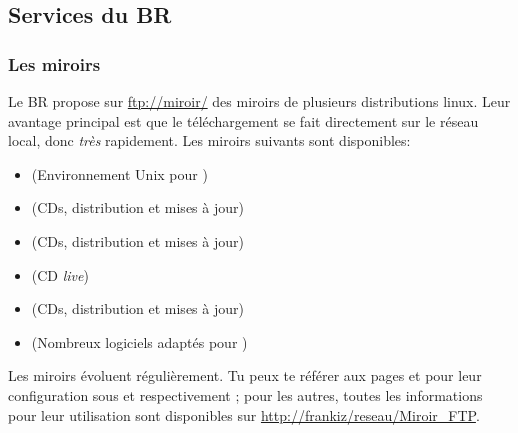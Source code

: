 \subsection{Services du BR}


\subsubsection{Les miroirs}
Le BR propose sur \url{ftp://miroir/} des miroirs de plusieurs distributions linux. Leur avantage principal est que le téléchargement se fait directement sur le réseau local, donc \emph{très} rapidement.
Les miroirs suivants sont disponibles:

\begin{itemize}
\item {} (Environnement Unix pour )
\item {} (CDs, distribution et mises à jour)
\item {} (CDs, distribution et mises à jour)
\item {} (CD \emph{live})
\item {} (CDs, distribution et mises à jour)
\item {} (Nombreux logiciels  adaptés pour )
\end{itemize}

\setcounter{page}{34}

Les miroirs évoluent régulièrement. Tu peux te référer aux pages \pageref{gentoo_mirror} et \pageref{ubuntu_mirror} pour leur configuration sous  et  respectivement ; pour les autres, toutes les informations pour leur utilisation sont disponibles sur \url{http://frankiz/reseau/Miroir\_FTP}.
